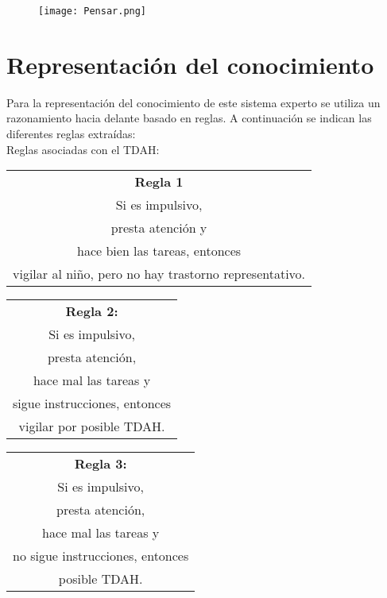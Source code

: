\documentclass[letterpaper,12pt]{article}
\begin{document}
\begin{figure}[h!]
				\begin{center}
					\texttt{[image: Pensar.png]}
				\end{center}
			\end{figure}
			
\clearpage

\section{Representación del conocimiento}

Para la representación del conocimiento de este sistema experto se utiliza
un razonamiento hacia delante basado en reglas. A continuación se indican las diferentes reglas extraídas: \\

Reglas asociadas con el TDAH:
\begin{center}
\begin{tabular}{|c|}
\hline 
\textbf{Regla 1} \\ 
Si es impulsivo, \\
presta atención y \\
hace bien las tareas, entonces \\
vigilar al niño, pero no hay trastorno representativo. \\
\hline 
\end{tabular} 
\end{center}


\begin{center}
\begin{tabular}{|c|}
\hline 
 \textbf{Regla 2:} \\
Si es impulsivo, \\
presta atención, \\
hace mal las tareas y \\
sigue instrucciones, entonces \\ 
vigilar por posible TDAH. \\
\hline 
\end{tabular} 
\end{center}

\begin{center}
\begin{tabular}{|c|}
\hline 
\textbf{Regla 3:} \\
Si es impulsivo, \\ 
presta atención, \\
hace mal las tareas y \\
no sigue instrucciones, entonces \\
posible TDAH. \\
\hline 
\end{tabular} 
\end{center}
\end{document}
